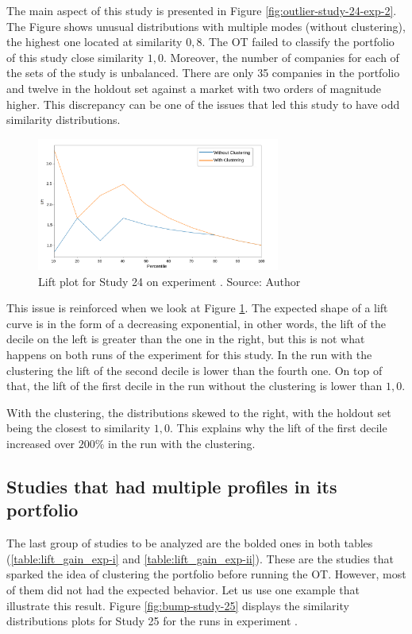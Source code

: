 The main aspect of this study is presented in Figure \ref{fig:outlier-study-24-exp-2}. The Figure shows unusual distributions with multiple modes (without clustering), the highest one located at similarity $0,8$. The OT failed to classify the portfolio of this study close similarity $1,0$. Moreover, the number of companies for each of the sets of the study is unbalanced. There are only 35 companies in the portfolio and twelve in the holdout set against a market with two orders of magnitude higher. This discrepancy can be one of the issues that led this study to have odd similarity distributions.

\begin{figure}[!ht]
   \centering
   \includegraphics[width=8cm]{fig/ch4-outlier-study-24-lift-exp-2.png}
   \caption{Lift plot for Study 24 on experiment \nameExperimentII{}. Source: Author}
   \label{fig:outlier-study-24-lift-exp-2}
\end{figure}

This issue is reinforced when we look at Figure \ref{fig:outlier-study-24-lift-exp-2}. The expected shape of a lift curve is in the form of a decreasing exponential, in other words, the lift of the decile on the left is greater than the one in the right, but this is not what happens on both runs of the experiment for this study. In the run with the clustering the lift of the second decile is lower than the fourth one. On top of that, the lift of the first decile in the run without the clustering is lower than $1,0$. 

With the clustering, the distributions skewed to the right, with the holdout set being the closest to similarity $1,0$. This explains why the lift of the first decile increased over $200\%$ in the run with the clustering.

\subsection{Studies that had multiple profiles in its portfolio}

The last group of studies to be analyzed are the bolded ones in both tables (\ref{table:lift_gain_exp-i} and \ref{table:lift_gain_exp-ii}). These are the studies that sparked the idea of clustering the portfolio before running the OT. However, most of them did not had the expected behavior. Let us use one example that illustrate this result. Figure \ref{fig:bump-study-25} displays the similarity distributions plots for Study 25 for the runs in experiment \nameExperimentII{}. 

